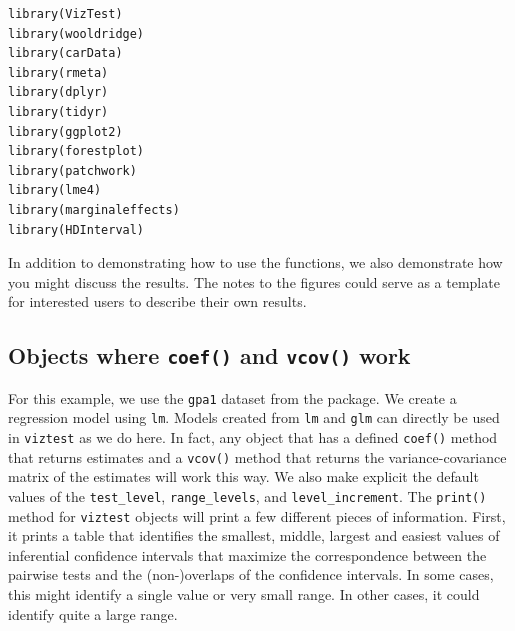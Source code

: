 \begin{verbatim}
library(VizTest)
library(wooldridge)
library(carData)
library(rmeta)
library(dplyr)
library(tidyr)
library(ggplot2)
library(forestplot)
library(patchwork)
library(lme4)
library(marginaleffects)
library(HDInterval)
\end{verbatim}

In addition to demonstrating how to use the functions, we also demonstrate how you might discuss the results. The notes to the figures could serve as a template for interested users to describe their own results.

\subsection{\texorpdfstring{Objects where \texttt{coef()} and \texttt{vcov()} work}{Objects where coef() and vcov() work}}\label{objects-where-coef-and-vcov-work}

For this example, we use the \texttt{gpa1} dataset from the  package. We create a regression model using \texttt{lm}. Models created from \texttt{lm} and \texttt{glm} can directly be used in \texttt{viztest} as we do here. In fact, any object that has a defined \texttt{coef()} method that returns estimates and a \texttt{vcov()} method that returns the variance-covariance matrix of the estimates will work this way. We also make explicit the default values of the \texttt{test\_level}, \texttt{range\_levels}, and \texttt{level\_increment}. The \texttt{print()} method for \texttt{viztest} objects will print a few different pieces of information. First, it prints a table that identifies the smallest, middle, largest and easiest values of inferential confidence intervals that maximize the correspondence between the pairwise tests and the (non-)overlaps of the confidence intervals. In some cases, this might identify a single value or very small range. In other cases, it could identify quite a large range.

